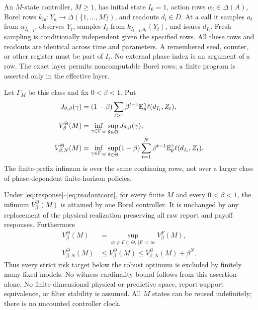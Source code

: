 \begin{definition}\label{def:controller}
An $M$-state controller, $M\ge1$, has initial state $I_0=1$, action rows $\alpha_i\in\Delta(A)$, Borel rows $k_{ia}:Y_a\to\Delta(\{1,\ldots,M\})$, and readouts $d_i\in D$. At a call it samples $a_t$ from $\alpha_{I_{t-1}}$, observes $Y_t$, samples $I_t$ from $k_{I_{t-1},a_t}(Y_t)$, and issues $d_{I_t}$. Fresh sampling is conditionally independent given the specified rows. All these rows and readouts are identical across time and parameters. A remembered seed, counter, or other register must be part of $I_t$. No external phase index is an argument of a row. The exact layer permits noncomputable Borel rows; a finite program is asserted only in the effective layer.
\end{definition}
Let $\Gamma_M$ be this class and fix $0<\beta<1$. Put
\begin{align}\label{eq:values}
 J_{\theta,\beta}(\gamma)&=(1-\beta)\sum_{t\ge1}\beta^{t-1}
                            \mathbb E_\theta^\gamma\ell(d_{I_t},Z_t),\\
 V_\beta^\Theta(M)&=\inf_{\gamma\in\Gamma_M}\sup_{\theta\in\Theta}J_{\theta,\beta}(\gamma),\\
 V_{\beta,N}^\Theta(M)&=\inf_{\gamma\in\Gamma_M}\sup_{\theta\in\Theta}
          (1-\beta)\sum_{t=1}^N\beta^{t-1}\mathbb E_\theta^\gamma\ell(d_{I_t},Z_t).\notag
\end{align}
The finite-prefix infimum is over the same continuing rows, not over a larger class of phase-dependent finite-horizon policies.

\begin{theorem}\label{thm:main}
Under \eqref{eq:response}--\eqref{eq:readoutcont}, for every finite $M$ and every $0<\beta<1$, the infimum $V_\beta^\Theta(M)$ is attained by one Borel controller. It is unchanged by any replacement of the physical realization preserving all raw report and payoff responses. Furthermore
\begin{align}\label{eq:finitewitness}
 V_\beta^\Theta(M)&=\sup_{\varnothing\ne F\subset\Theta,\,|F|<\infty}V_\beta^F(M),\\
 V_{\beta,N}^\Theta(M)&\le V_\beta^\Theta(M)
                  \le V_{\beta,N}^\Theta(M)+\beta^N.\label{eq:tail}
\end{align}
Thus every strict risk target below the robust optimum is excluded by finitely many fixed models. No witness-cardinality bound follows from this assertion alone. No finite-dimensional physical or predictive space, report-support equivalence, or filter stability is assumed. All $M$ states can be reused indefinitely; there is no uncounted controller clock.
\end{theorem}

